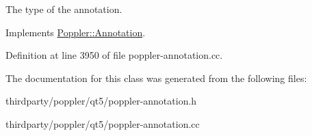 The type of the annotation. 

Implements \hyperlink{class_poppler_1_1_annotation_aef7fa1532193b41fbeba6e577579d984}{Poppler\+::\+Annotation}.



Definition at line 3950 of file poppler-\/annotation.\+cc.



The documentation for this class was generated from the following files\+:\begin{DoxyCompactItemize}
\item 
thirdparty/poppler/qt5/poppler-\/annotation.\+h\item 
thirdparty/poppler/qt5/poppler-\/annotation.\+cc\end{DoxyCompactItemize}
